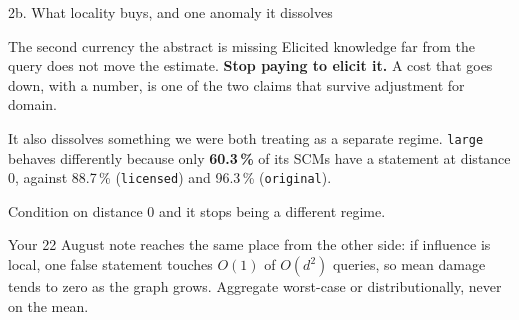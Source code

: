 \documentclass[10pt,aspectratio=169]{beamer}
\newcommand{\wn}[1]{\textcolor{warn}{#1}}
\begin{document}
\begin{frame}{2b. What locality buys, and one anomaly it dissolves}
\begin{block}{The second currency the abstract is missing}
Elicited knowledge far from the query does not move the estimate. \textbf{Stop paying to elicit
it.} A cost that goes down, with a number, is one of the two claims that survive adjustment for
domain.
\end{block}

\medskip
It also dissolves something we were both treating as a separate regime. \texttt{large} behaves
differently because only \textbf{60.3\,\%} of its SCMs have a statement at distance 0, against
88.7\,\% (\texttt{licensed}) and 96.3\,\% (\texttt{original}).

\medskip
Condition on distance 0 and it stops being a different regime.

\medskip
\wn{Your 22 August note reaches the same place from the other side}: if influence is local, one false
statement touches $O(1)$ of $O(d^2)$ queries, so mean damage tends to zero as the graph grows.
Aggregate worst-case or distributionally, never on the mean.
\end{frame}
\end{document}
